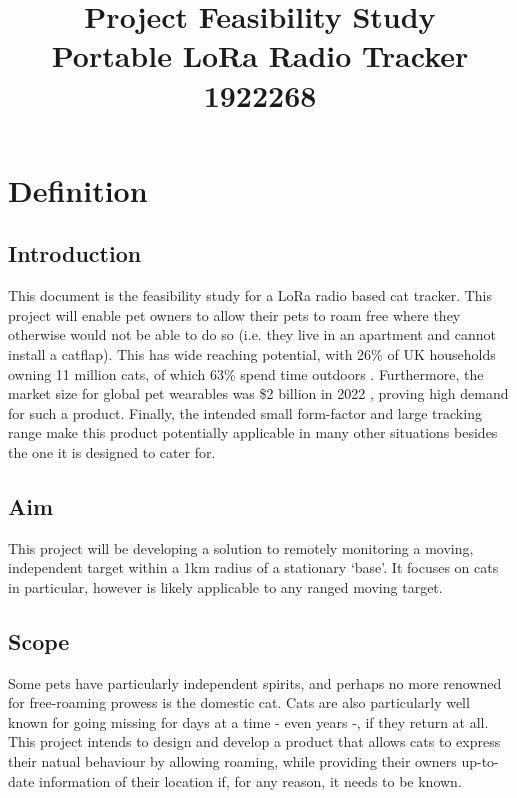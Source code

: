 \documentclass[11pt]{article}
\title{\huge Project Feasibility Study\\\Large Portable LoRa Radio Tracker\vspace{0.4em}\\\large 1922268\vspace{-2em}}
\author{}
\date{}
\begin{document}
\onehalfspacing

\maketitle

\section{Definition}
\subsection{Introduction}
This document is the feasibility study for a LoRa radio based cat tracker.
This project will enable pet owners to allow their pets to roam free where they otherwise would not be able to do so 
(i.e. they live in an apartment and cannot install a catflap).
This has wide reaching potential, with 26\% of UK households owning 11 million cats, of which 63\% spend time outdoors \cite{catsprotection:catsreport}.
Furthermore, the market size for global pet wearables was \$2 billion in 2022 \cite{researchandmarkets:wearablemarket}, proving high demand for such a product. 
Finally, the intended small form-factor and large tracking range make this product potentially applicable 
in many other situations besides the one it is designed to cater for.

\subsection{Aim}
This project will be developing a solution to remotely monitoring a moving,
independent target within a 1km radius of a stationary `base'.
It focuses on cats in particular, however is likely applicable to any ranged moving target.

\subsection{Scope}
Some pets have particularly independent spirits, and perhaps no more renowned for free-roaming prowess is the domestic cat.
Cats are also particularly well known for going missing for days at a time - even years \cite{bbc:missingcat} -, if they return at all.
This project intends to design and develop a product that allows cats to express their natual behaviour \cite{catsprotection:essentialguide} by allowing roaming, 
while providing their owners up-to-date information of their location if, for any reason, it needs to be known.
\end{document}
